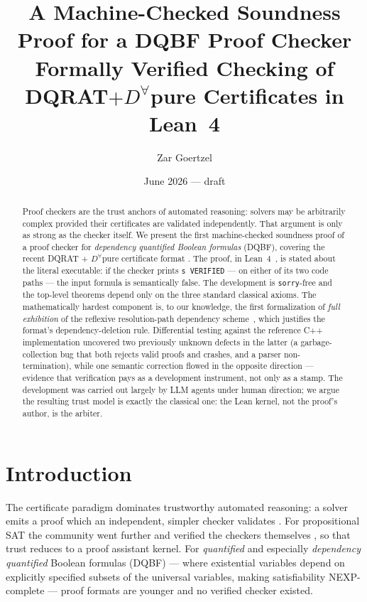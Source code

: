 \documentclass{article}
\title{A Machine-Checked Soundness Proof for a DQBF Proof Checker\\
{\large Formally Verified Checking of DQRAT$+D^{\forall}$pure Certificates in Lean~4}}
\author{Zar Goertzel}
\date{June 2026 — draft}
\begin{document}
\maketitle

\begin{abstract}
Proof checkers are the trust anchors of automated reasoning: solvers may be
arbitrarily complex provided their certificates are validated independently.
That argument is only as strong as the checker itself. We present the first
machine-checked soundness proof of a proof checker for \emph{dependency
quantified Boolean formulas} (DQBF), covering the recent
DQRAT + $D^{\forall}$pure certificate format \cite{dqratcheck}. The proof, in
Lean~4~\cite{MouraUllrich2021}, is stated about the literal executable: if the
checker prints \texttt{s VERIFIED} --- on either of its two code paths --- the
input formula is semantically false. The development is \texttt{sorry}-free
and the top-level theorems depend only on the three standard classical axioms.
The mathematically hardest component is, to our knowledge, the first
formalization of \emph{full exhibition} of the reflexive resolution-path
dependency scheme~\cite{BeyersdorffBlinkhornChewSchmidtSuda2019,
WimmerWimmerSchollBecker2016}, which justifies the format's dependency-deletion
rule. Differential testing against the reference C++ implementation uncovered
two previously unknown defects in the latter (a garbage-collection bug that
both rejects valid proofs and crashes, and a parser non-termination), while one
semantic correction flowed in the opposite direction --- evidence that
verification pays as a development instrument, not only as a stamp. The
development was carried out largely by LLM agents under human direction; we
argue the resulting trust model is exactly the classical one: the Lean kernel,
not the proof's author, is the arbiter.
\end{abstract}

\section{Introduction}
The certificate paradigm dominates trustworthy automated reasoning: a solver
emits a proof which an independent, simpler checker validates
\cite{WetzlerHeuleHunt2014}. For propositional SAT the community went further
and verified the checkers themselves
\cite{CruzFilipeEtAl2017,Lammich2017}, so that trust reduces to a proof
assistant kernel. For \emph{quantified} and especially \emph{dependency
quantified} Boolean formulas (DQBF) --- where existential variables depend on
explicitly specified subsets of the universal variables, making satisfiability
\textsc{NEXP}-complete \cite{PetersonReif1979} --- proof formats are younger
\cite{HeuleSeidlBiere2014,dqratcheck} and no verified checker existed.
\end{document}
